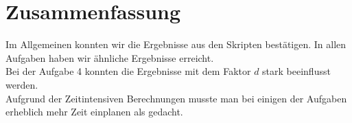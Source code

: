 \chapter{Zusammenfassung}

Im Allgemeinen konnten wir die Ergebnisse aus den Skripten bestätigen. In allen Aufgaben haben wir ähnliche Ergebnisse erreicht.\\

Bei der Aufgabe 4 konnten die Ergebnisse mit dem Faktor $d$ stark beeinflusst werden.\\

Aufgrund der Zeitintensiven Berechnungen musste man bei einigen der Aufgaben erheblich mehr Zeit einplanen als gedacht.
